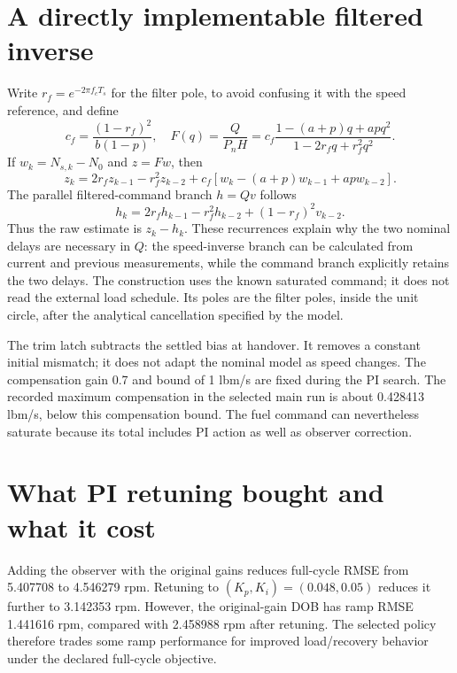 \section{A directly implementable filtered inverse}
Write $r_f=e^{-2\pi f_cT_s}$ for the filter pole, to avoid confusing it with the speed reference, and define
\begin{equation}c_f=\frac{(1-r_f)^2}{b(1-p)},\quad
F(q)=\frac{Q}{P_nH}=c_f\frac{1-(a+p)q+apq^2}{1-2r_fq+r_f^2q^2}.
\end{equation}
If $w_k=N_{s,k}-N_0$ and $z=Fw$, then
\begin{equation}z_k=2r_fz_{k-1}-r_f^2z_{k-2}+c_f[w_k-(a+p)w_{k-1}+apw_{k-2}].
\end{equation}
The parallel filtered-command branch $h=Qv$ follows
\begin{equation}h_k=2r_fh_{k-1}-r_f^2h_{k-2}+(1-r_f)^2v_{k-2}.
\end{equation}
Thus the raw estimate is $z_k-h_k$. These recurrences explain why the two nominal delays are necessary in $Q$: the speed-inverse branch can be calculated from current and previous measurements, while the command branch explicitly retains the two delays. The construction uses the known saturated command; it does not read the external load schedule. Its poles are the filter poles, inside the unit circle, after the analytical cancellation specified by the model.

The trim latch subtracts the settled bias at handover. It removes a constant initial mismatch; it does not adapt the nominal model as speed changes. The compensation gain 0.7 and bound of 1 lbm/s are fixed during the PI search. The recorded maximum compensation in the selected main run is about 0.428413 lbm/s, below this compensation bound. The fuel command can nevertheless saturate because its total includes PI action as well as observer correction.

\section{What PI retuning bought and what it cost}
Adding the observer with the original gains reduces full-cycle RMSE from 5.407708 to 4.546279 rpm. Retuning to $(K_p,K_i)=(0.048,0.05)$ reduces it further to 3.142353 rpm. However, the original-gain DOB has ramp RMSE 1.441616 rpm, compared with 2.458988 rpm after retuning. The selected policy therefore trades some ramp performance for improved load/recovery behavior under the declared full-cycle objective.


